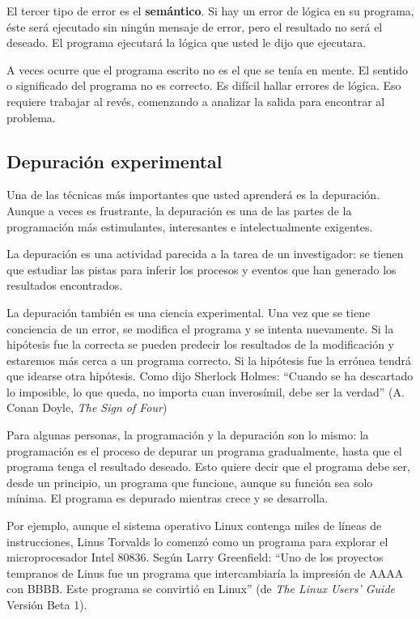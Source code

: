   

El tercer tipo de error es el \textbf{semántico}. Si hay un error
de lógica en su programa, éste será ejecutado sin ningún mensaje de
error, pero el resultado no será el deseado. El programa ejecutará
la lógica que usted le dijo que ejecutara.

A veces ocurre que el programa escrito no es el que se tenía en mente.
El sentido o significado del programa no es correcto. Es difícil hallar
errores de lógica. Eso requiere trabajar al revés, comenzando a analizar
la salida para encontrar al problema.

\subsection{Depuración experimental}

Una de las técnicas más importantes que usted aprenderá es la depuración.
Aunque a veces es frustrante, la depuración es una de las partes de
la programación más estimulantes, interesantes e intelectualmente
exigentes.

La depuración es una actividad parecida a la tarea de un investigador:
se tienen que estudiar las pistas para inferir los procesos y eventos
que han generado los resultados encontrados.

La depuración también es una ciencia experimental. Una vez que se
tiene conciencia de un error, se modifica el programa y se intenta
nuevamente. Si la hipótesis fue la correcta se pueden predecir los
resultados de la modificación y estaremos más cerca a un programa
correcto. Si la hipótesis fue la errónea tendrá que idearse otra hipótesis.
Como dijo Sherlock Holmes: ``Cuando se ha descartado lo imposible,
lo que queda, no importa cuan inverosímil, debe ser la verdad'' (A.
Conan Doyle, {\em The Sign of Four})

 

Para algunas personas, la programación y la depuración son lo mismo:
la programación es el proceso de depurar un programa gradualmente,
hasta que el programa tenga el resultado deseado. Esto quiere decir
que el programa debe ser, desde un principio, un programa que funcione,
aunque su función sea solo mínima. El programa es depurado mientras
crece y se desarrolla.

Por ejemplo, aunque el sistema operativo Linux contenga miles de líneas
de instrucciones, Linus Torvalds lo comenzó como un programa para
explorar el microprocesador Intel 80836. Según Larry Greenfield: ``Uno
de los proyectos tempranos de Linus fue un programa que intercambiaría
la impresión de AAAA con BBBB. Este programa se convirtió en Linux''
(de {\em The Linux Users' Guide} Versión Beta 1).

